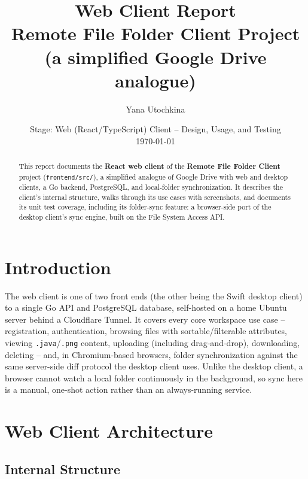\documentclass[12pt,a4paper]{article}
\title{\textbf{Web Client Report\\[2pt] \large Remote File Folder Client Project\\(a simplified Google Drive analogue)}}
\author{Yana Utochkina}
\date{Stage: Web (React/TypeScript) Client -- Design, Usage, and Testing \\ \today}
\begin{document}
\maketitle

\begin{abstract}
\noindent
This report documents the \textbf{React web client} of the \textbf{Remote File Folder Client} project (\texttt{frontend/src/}), a simplified analogue of Google Drive with web and desktop clients, a Go backend, PostgreSQL, and local-folder synchronization. It describes the client's internal structure, walks through its use cases with screenshots, and documents its unit test coverage, including its folder-sync feature: a browser-side port of the desktop client's sync engine, built on the File System Access API.
\end{abstract}

\tableofcontents
\newpage

\section{Introduction}

The web client is one of two front ends (the other being the Swift desktop client) to a single Go API and PostgreSQL database, self-hosted on a home Ubuntu server behind a Cloudflare Tunnel. It covers every core workspace use case -- registration, authentication, browsing files with sortable/filterable attributes, viewing \texttt{.java}/\texttt{.png} content, uploading (including drag-and-drop), downloading, deleting -- and, in Chromium-based browsers, folder synchronization against the same server-side diff protocol the desktop client uses. Unlike the desktop client, a browser cannot watch a local folder continuously in the background, so sync here is a manual, one-shot action rather than an always-running service.

\section{Web Client Architecture}

\subsection{Internal Structure}
\end{document}
